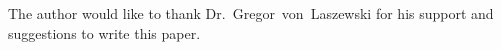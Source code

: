 \begin{acks}

  The author would like to thank Dr.~Gregor~von~Laszewski for his
  support and suggestions to write this paper.

\end{acks}


 

